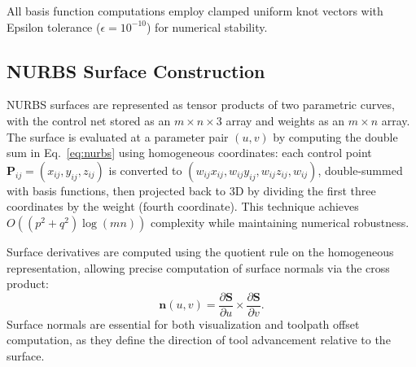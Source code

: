 \documentclass[a4paper,12pt]{article}
\begin{document}
All basis function computations employ clamped uniform knot vectors with
Epsilon tolerance ($\epsilon = 10^{-10}$) for numerical stability.

\subsection{NURBS Surface Construction}

NURBS surfaces are represented as tensor products of two parametric curves,
with the control net stored as an $m \times n \times 3$ array and weights as
an $m \times n$ array. The surface is evaluated at a parameter pair $(u, v)$
by computing the double sum in Eq.~\eqref{eq:nurbs} using homogeneous
coordinates: each control point $\mathbf{P}_{ij} = (x_{ij}, y_{ij}, z_{ij})$
is converted to $(w_{ij} x_{ij}, w_{ij} y_{ij}, w_{ij} z_{ij}, w_{ij})$,
double-summed with basis functions, then projected back to 3D by dividing the
first three coordinates by the weight (fourth coordinate). This technique
achieves $O((p^2 + q^2) \log(mn))$ complexity while maintaining numerical
robustness.

Surface derivatives are computed using the quotient rule on the homogeneous
representation, allowing precise computation of surface normals via the
cross product:
\begin{equation}
  \mathbf{n}(u, v) = \frac{\partial \mathbf{S}}{\partial u} \times
    \frac{\partial \mathbf{S}}{\partial v}.
\end{equation}
Surface normals are essential for both visualization and toolpath offset
computation, as they define the direction of tool advancement relative to the
surface.
\end{document}
